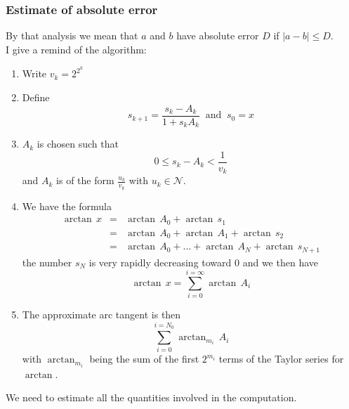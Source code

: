 \documentclass[12pt]{amsart}
\def\N{{\mathcal N}}
\begin{document}
\subsubsection{Estimate of absolute error}
\noindent By that analysis we mean that $a$ and $b$ have absolute error $D$ if $|a-b|\leq D$.\\
I give a remind of the algorithm:
\begin{enumerate}
\item Write $v_k=2^{2^k}$
\item Define
\begin{equation*}
s_{k+1}=\frac{s_k-A_k}{1+s_kA_k}\;\;\mbox{and}\;\;s_0=x
\end{equation*}
\item $A_k$ is chosen such that
\begin{equation*}
0\leq s_k-A_k<\frac{1}{v_k}
\end{equation*}
and $A_k$ is of the form $\frac{u_k}{v_k}$ with $u_k\in\N$.
\item We have the formula
\begin{equation*}
\begin{array}{rcl}
\arctan\,x
&=&\arctan\,A_0+\arctan\,s_1\\
&=&\arctan\,A_0+\arctan\,A_1+\arctan\,s_2\\
&=&\arctan\,A_0+\dots+\arctan\,A_N+\arctan\,s_{N+1}
\end{array}
\end{equation*}
the number $s_N$ is very rapidly decreasing toward $0$ and we then have
\[\arctan\,x = \sum_{i=0}^{i=\infty}\arctan\,A_i\]
\item The approximate arc tangent is then
\[\sum_{i=0}^{i=N_0}\arctan_{m_i}\,A_i\]
with $\arctan_{m_i}$ being the sum of the first $2^{m_i}$ terms of the
Taylor series for $\arctan$.
\end{enumerate}
We need to estimate all the quantities involved in the computation.
\end{document}
